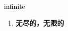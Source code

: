 
\begin{frame}
{\huge infinite}
\begin{center}
\begin{enumerate}\Large
  \item \textbf{无尽的，无限的}
\end{enumerate}
\end{center}
\end{frame}
